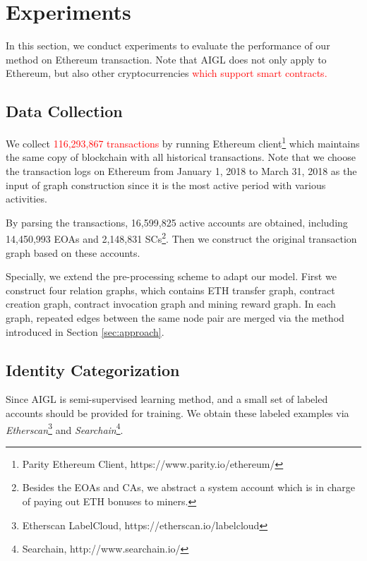 
\section{Experiments}
\label{sec:experiments}
In this section, we conduct experiments to evaluate the performance of our method on Ethereum transaction. Note that AIGL does not only apply to Ethereum, but also other cryptocurrencies \textcolor{red}{which support smart contracts.}

\subsection{Data Collection}
We collect \textcolor{red}{116,293,867 transactions} by running Ethereum client\footnote{Parity Ethereum Client, https://www.parity.io/ethereum/} which maintains the same copy of blockchain with all historical transactions. Note that we choose the transaction logs on Ethereum from January 1, 2018 to March 31, 2018 as the input of graph construction since it is the most active period with various activities.

By parsing the transactions, 16,599,825 active accounts are obtained, including 14,450,993 EOAs and 2,148,831 SCs\footnote{Besides the EOAs and CAs, we abstract a system account which is in charge of paying out ETH bonuses to miners.}. Then we construct the original transaction graph based on these accounts.

Specially, we extend the pre-processing scheme to adapt our model. First we construct four relation graphs, which contains ETH transfer graph, contract creation graph, contract invocation graph and mining reward graph. In each graph, repeated edges between the same node pair are merged via the method introduced in Section \ref{sec:approach}.


\subsection{Identity Categorization}
Since AIGL is semi-supervised learning method, and a small set of labeled accounts should be provided for training. We obtain these labeled examples via \emph{Etherscan}\footnote{Etherscan LabelCloud, https://etherscan.io/labelcloud} and \emph{Searchain}\footnote{Searchain, http://www.searchain.io/}.

